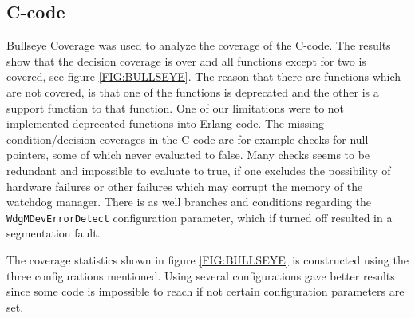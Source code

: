 \subsection{C-code}
Bullseye Coverage was used to analyze the coverage of the C-code. The
results show that the decision coverage is over {\bullseyecoverage}
and all functions except for two is covered, see figure
\ref{FIG:BULLSEYE}. The reason that there are functions which are not
covered, is that one of the functions is deprecated and the other is a
support function to that function. One of our limitations were to not
implemented deprecated functions into Erlang code.  The missing
condition/decision coverages in the C-code are for example checks for
null pointers, some of which never evaluated to false. Many checks
seems to be redundant and impossible to evaluate to true, if one
excludes the possibility of hardware failures or other failures which
may corrupt the memory of the watchdog manager. There is as well
branches and conditions regarding the \lstinline!WdgMDevErrorDetect!
configuration parameter, which if turned off resulted in a
segmentation fault.

The coverage statistics shown in figure \ref{FIG:BULLSEYE} is
constructed using the three configurations mentioned. Using several configurations
gave better results since some code is impossible to reach if not
certain configuration parameters are set.


